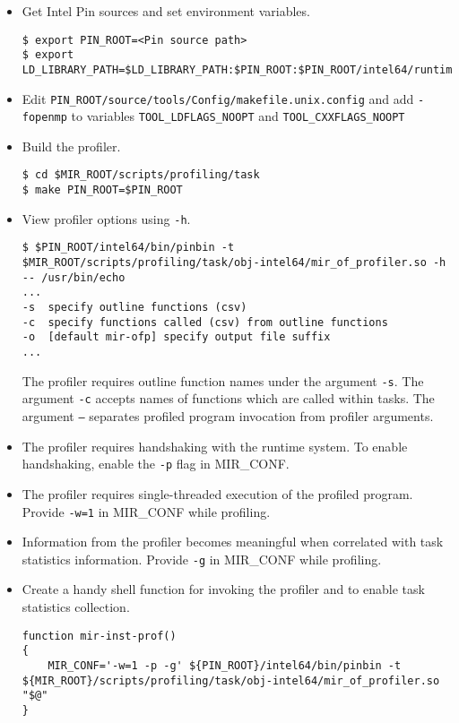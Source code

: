 \documentclass[11pt,a4paper]{article}
\begin{document}
\begin{itemize}
\item Get Intel Pin sources and set environment variables.

\begin{lstlisting}[style=MyInputStyle]
$ export PIN_ROOT=<Pin source path>
$ export LD_LIBRARY_PATH=$LD_LIBRARY_PATH:$PIN_ROOT:$PIN_ROOT/intel64/runtime
\end{lstlisting}

\item Edit \texttt{PIN\_ROOT/source/tools/Config/makefile.unix.config} and add \texttt{-fopenmp} to variables \texttt{TOOL\_LDFLAGS\_NOOPT}  and \texttt{TOOL\_CXXFLAGS\_NOOPT}

\item Build the profiler.

\begin{lstlisting}[style=MyInputStyle]
$ cd $MIR_ROOT/scripts/profiling/task
$ make PIN_ROOT=$PIN_ROOT
\end{lstlisting}

\item View profiler options using \texttt{-h}.

\begin{lstlisting}[style=MyInputStyle]
$ $PIN_ROOT/intel64/bin/pinbin -t $MIR_ROOT/scripts/profiling/task/obj-intel64/mir_of_profiler.so -h -- /usr/bin/echo
...
-s  specify outline functions (csv)
-c  specify functions called (csv) from outline functions
-o  [default mir-ofp] specify output file suffix
...
\end{lstlisting}

The profiler requires outline function names under the argument \texttt{-s}. The argument \texttt{-c} accepts names of functions which are called within tasks. The argument \texttt{--} separates profiled program invocation from profiler arguments.

\item The profiler requires handshaking with the runtime system. To enable handshaking, enable the \texttt{-p} flag in MIR\_CONF.

\item The profiler requires single-threaded execution of the profiled program. Provide \texttt{-w=1} in MIR\_CONF while profiling.

\item Information from the profiler becomes meaningful when correlated with task statistics information. Provide \texttt{-g} in MIR\_CONF while profiling.

\item Create a handy shell function for invoking the profiler and to enable task statistics collection.
  
\begin{lstlisting}[style=MyInputStyle]
function mir-inst-prof()
{
    MIR_CONF='-w=1 -p -g' ${PIN_ROOT}/intel64/bin/pinbin -t ${MIR_ROOT}/scripts/profiling/task/obj-intel64/mir_of_profiler.so "$@"
}
\end{lstlisting}
\end{itemize}
\end{document}
